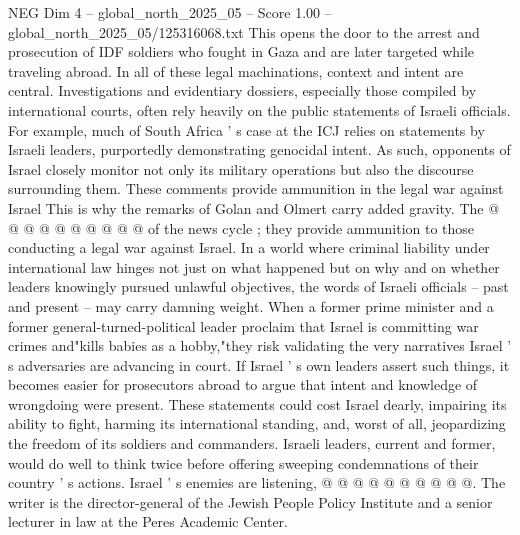 \begin{textsample}{NEG Dim 4 – global\_north\_2025\_05 – Score 1.00 – global\_north\_2025\_05/125316068.txt}
This opens the door to the arrest and prosecution of IDF soldiers who fought in Gaza and are later targeted while traveling abroad.
In all of these legal machinations, context and intent are central.
Investigations and evidentiary dossiers, especially those compiled by international courts, often rely heavily on the public statements of Israeli officials.
For example, much of South Africa ' s case at the ICJ relies on statements by Israeli leaders, purportedly demonstrating genocidal intent.
As such, opponents of Israel closely monitor not only its military operations but also the discourse surrounding them.
These comments provide ammunition in the legal war against Israel This is why the remarks of Golan and Olmert carry added gravity.
The @ @ @ @ @ @ @ @ @ @ of the news cycle ; they provide ammunition to those conducting a legal war against Israel.
In a world where criminal liability under international law hinges not just on what happened but on why and on whether leaders knowingly pursued unlawful objectives, the words of Israeli officials -- past and present -- may carry damning weight.
When a former prime minister and a former general-turned-political leader proclaim that Israel is committing war crimes and"kills babies as a hobby,"they risk validating the very narratives Israel ' s adversaries are advancing in court.
If Israel ' s own leaders assert such things, it becomes easier for prosecutors abroad to argue that intent and knowledge of wrongdoing were present.
These statements could cost Israel dearly, impairing its ability to fight, harming its international standing, and, worst of all, jeopardizing the freedom of its soldiers and commanders.
Israeli leaders, current and former, would do well to think twice before offering sweeping condemnations of their country ' s actions.
Israel ' s enemies are listening, @ @ @ @ @ @ @ @ @ @.
The writer is the director-general of the Jewish People Policy Institute and a senior lecturer in law at the Peres Academic Center.

\end{textsample}
